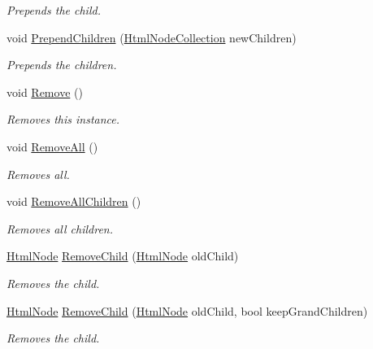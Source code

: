 \begin{DoxyCompactItemize}
\begin{DoxyCompactList}\small\item\em Prepends the child. \end{DoxyCompactList}\item 
void \hyperlink{class_html_agility_pack_1_1_html_node_a8baeef167ff771ed219dbb9e39518994}{Prepend\+Children} (\hyperlink{class_html_agility_pack_1_1_html_node_collection}{Html\+Node\+Collection} new\+Children)
\begin{DoxyCompactList}\small\item\em Prepends the children. \end{DoxyCompactList}\item 
void \hyperlink{class_html_agility_pack_1_1_html_node_a5ce8d28c061c20981e8b1f9e44f27f95}{Remove} ()
\begin{DoxyCompactList}\small\item\em Removes this instance. \end{DoxyCompactList}\item 
void \hyperlink{class_html_agility_pack_1_1_html_node_a046ef0f6d482e429c4f48056a8464060}{Remove\+All} ()
\begin{DoxyCompactList}\small\item\em Removes all. \end{DoxyCompactList}\item 
void \hyperlink{class_html_agility_pack_1_1_html_node_ae565d81a4648fb3c6d5bd95fc91e2d29}{Remove\+All\+Children} ()
\begin{DoxyCompactList}\small\item\em Removes all children. \end{DoxyCompactList}\item 
\hyperlink{class_html_agility_pack_1_1_html_node}{Html\+Node} \hyperlink{class_html_agility_pack_1_1_html_node_a100e3e038668cab3505109847ea8b075}{Remove\+Child} (\hyperlink{class_html_agility_pack_1_1_html_node}{Html\+Node} old\+Child)
\begin{DoxyCompactList}\small\item\em Removes the child. \end{DoxyCompactList}\item 
\hyperlink{class_html_agility_pack_1_1_html_node}{Html\+Node} \hyperlink{class_html_agility_pack_1_1_html_node_ad9c55b1e284a40dd55ba42712f4e7074}{Remove\+Child} (\hyperlink{class_html_agility_pack_1_1_html_node}{Html\+Node} old\+Child, bool keep\+Grand\+Children)
\begin{DoxyCompactList}\small\item\em Removes the child. \end{DoxyCompactList}\item 

\end{DoxyCompactItemize}
